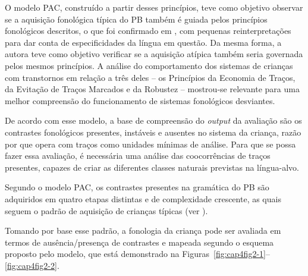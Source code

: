 \documentclass[output=paper,colorlinks,citecolor=brown,booklanguage=portuguese]{langscibook}
\begin{document}
O modelo PAC, construído a partir desses princípios, teve como objetivo observar se a aquisição fonológica típica do PB também é guiada pelos princípios fonológicos descritos, o que foi confirmado em \citet{LazzarottoVolcao2009}, com pequenas reinterpretações para dar conta de especificidades da língua em questão. Da mesma forma, a autora teve como objetivo verificar se a aquisição atípica também seria governada pelos mesmos princípios. A análise do comportamento dos sistemas de crianças com transtornos em relação a três deles – os Princípios da Economia de Traços, da Evitação de Traços Marcados e da Robustez – mostrou-se relevante para uma melhor compreensão do funcionamento de sistemas fonológicos desviantes.

De acordo com esse modelo, a base de compreensão do \emph{output} da avaliação são os contrastes fonológicos presentes, instáveis e ausentes no sistema da criança, razão por que opera com traços como unidades mínimas de análise. Para que se possa fazer essa avaliação, é necessária uma análise das coocorrências de traços presentes, capazes de criar as diferentes classes naturais previstas na língua-alvo.

Segundo o modelo PAC, os contrastes presentes na gramática do PB são adquiridos em quatro etapas distintas e de complexidade crescente, as quais seguem o padrão de aquisição de crianças típicas (ver \citealt{LazzarottoVolcao2009}).

Tomando por base esse padrão, a fonologia da criança pode ser avaliada em termos de ausência/presença de contrastes e mapeada segundo o esquema proposto pelo modelo, que está demonstrado na Figuras~\ref{fig:cap4fig2-1}--\ref{fig:cap4fig2-2}.
\end{document}
